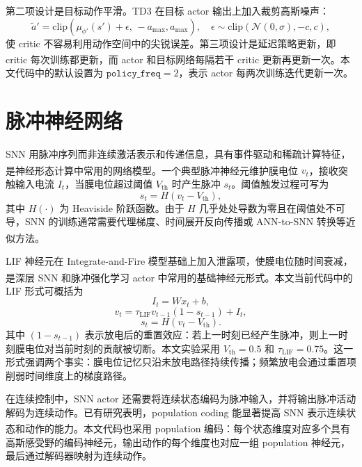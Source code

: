 \documentclass[UTF8,zihao=-4,oneside,openany]{ctexbook}
\let\oldcite\cite
\renewcommand{\cite}[1]{\textsuperscript{\oldcite{#1}}}
\begin{document}
第二项设计是目标动作平滑。TD3 在目标 actor 输出上加入裁剪高斯噪声：
\begin{equation}
\tilde{a}'=\mathrm{clip}\left(\mu_{\phi'}(s')+\epsilon,\,-a_{\max},a_{\max}\right),
\quad
\epsilon\sim\mathrm{clip}(\mathcal{N}(0,\sigma),-c,c),
\end{equation}
使 critic 不容易利用动作空间中的尖锐误差。第三项设计是延迟策略更新，即 critic 每次训练都更新，而 actor 和目标网络每隔若干 critic 更新再更新一次\cite{fujimoto2018td3}。本文代码中的默认设置为 $\texttt{policy\_freq}=2$，表示 actor 每两次训练迭代更新一次。

\section{脉冲神经网络}
SNN 用脉冲序列而非连续激活表示和传递信息，具有事件驱动和稀疏计算特征，是神经形态计算中常用的网络模型\cite{maass1997third,davies2018loihi,roy2019neuromorphic,neftci2019surrogate}。一个典型脉冲神经元维护膜电位 $v_t$，接收突触输入电流 $I_t$，当膜电位超过阈值 $V_{\mathrm{th}}$ 时产生脉冲 $s_t$。阈值触发过程可写为
\begin{equation}
s_t=H(v_t-V_{\mathrm{th}}),
\end{equation}
其中 $H(\cdot)$ 为 Heaviside 阶跃函数。由于 $H$ 几乎处处导数为零且在阈值处不可导，SNN 的训练通常需要代理梯度、时间展开反向传播或 ANN-to-SNN 转换等近似方法\cite{bohte2002error,rueckauer2017conversion,lee2016backprop,wu2018stbp,neftci2019surrogate,tavanaei2019deep,eshraghian2023training}。

LIF 神经元在 Integrate-and-Fire 模型基础上加入泄露项，使膜电位随时间衰减，是深层 SNN 和脉冲强化学习 actor 中常用的基础神经元形式\cite{gerstner2002spiking,izhikevich2003simple,lee2016backprop,tang2020popsan,chen2024fully}。本文当前代码中的 LIF 形式可概括为
\begin{equation}
I_t = W x_t + b,
\end{equation}
\begin{equation}
v_t=\tau_{\mathrm{LIF}} v_{t-1}(1-s_{t-1})+I_t,
\end{equation}
\begin{equation}
s_t=H(v_t-V_{\mathrm{th}}).
\end{equation}
其中 $(1-s_{t-1})$ 表示放电后的重置效应：若上一时刻已经产生脉冲，则上一时刻膜电位对当前时刻的贡献被切断。本文实验采用 $V_{\mathrm{th}}=0.5$ 和 $\tau_{\mathrm{LIF}}=0.75$。这一形式强调两个事实：膜电位记忆只沿未放电路径持续传播；频繁放电会通过重置项削弱时间维度上的梯度路径。

在连续控制中，SNN actor 还需要将连续状态编码为脉冲输入，并将输出脉冲活动解码为连续动作。已有研究表明，population coding 能显著提高 SNN 表示连续状态和动作的能力\cite{tang2020popsan,zhang2022mdc}。本文代码也采用 population 编码：每个状态维度对应多个具有高斯感受野的编码神经元，输出动作的每个维度也对应一组 population 神经元，最后通过解码器映射为连续动作。
\end{document}
